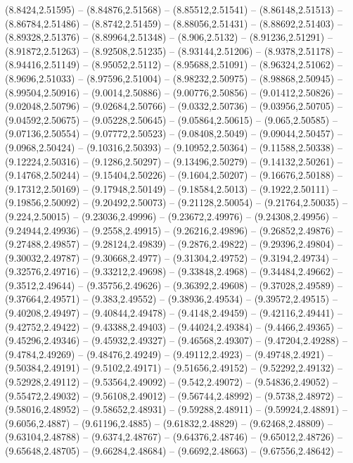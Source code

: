 {(8.8424,2.51595) -- (8.84876,2.51568) -- (8.85512,2.51541) -- (8.86148,2.51513) -- (8.86784,2.51486) -- (8.8742,2.51459) -- (8.88056,2.51431) -- (8.88692,2.51403) -- (8.89328,2.51376) -- (8.89964,2.51348) -- (8.906,2.5132) -- (8.91236,2.51291) --
(8.91872,2.51263) -- (8.92508,2.51235) -- (8.93144,2.51206) -- (8.9378,2.51178) -- (8.94416,2.51149) -- (8.95052,2.5112) -- (8.95688,2.51091) -- (8.96324,2.51062) -- (8.9696,2.51033) -- (8.97596,2.51004) -- (8.98232,2.50975) -- (8.98868,2.50945) --
(8.99504,2.50916) -- (9.0014,2.50886) -- (9.00776,2.50856) -- (9.01412,2.50826) -- (9.02048,2.50796) -- (9.02684,2.50766) -- (9.0332,2.50736) -- (9.03956,2.50705) -- (9.04592,2.50675) -- (9.05228,2.50645) -- (9.05864,2.50615) -- (9.065,2.50585) --
(9.07136,2.50554) -- (9.07772,2.50523) -- (9.08408,2.5049) -- (9.09044,2.50457) -- (9.0968,2.50424) -- (9.10316,2.50393) -- (9.10952,2.50364) -- (9.11588,2.50338) -- (9.12224,2.50316) -- (9.1286,2.50297) -- (9.13496,2.50279) -- (9.14132,2.50261) --
(9.14768,2.50244) -- (9.15404,2.50226) -- (9.1604,2.50207) -- (9.16676,2.50188) -- (9.17312,2.50169) -- (9.17948,2.50149) -- (9.18584,2.5013) -- (9.1922,2.50111) -- (9.19856,2.50092) -- (9.20492,2.50073) -- (9.21128,2.50054) -- (9.21764,2.50035) --
(9.224,2.50015) -- (9.23036,2.49996) -- (9.23672,2.49976) -- (9.24308,2.49956) -- (9.24944,2.49936) -- (9.2558,2.49915) -- (9.26216,2.49896) -- (9.26852,2.49876) -- (9.27488,2.49857) -- (9.28124,2.49839) -- (9.2876,2.49822) -- (9.29396,2.49804) --
(9.30032,2.49787) -- (9.30668,2.4977) -- (9.31304,2.49752) -- (9.3194,2.49734) -- (9.32576,2.49716) -- (9.33212,2.49698) -- (9.33848,2.4968) -- (9.34484,2.49662) -- (9.3512,2.49644) -- (9.35756,2.49626) -- (9.36392,2.49608) -- (9.37028,2.49589) --
(9.37664,2.49571) -- (9.383,2.49552) -- (9.38936,2.49534) -- (9.39572,2.49515) -- (9.40208,2.49497) -- (9.40844,2.49478) -- (9.4148,2.49459) -- (9.42116,2.49441) -- (9.42752,2.49422) -- (9.43388,2.49403) -- (9.44024,2.49384) -- (9.4466,2.49365) --
(9.45296,2.49346) -- (9.45932,2.49327) -- (9.46568,2.49307) -- (9.47204,2.49288) -- (9.4784,2.49269) -- (9.48476,2.49249) -- (9.49112,2.4923) -- (9.49748,2.4921) -- (9.50384,2.49191) -- (9.5102,2.49171) -- (9.51656,2.49152) -- (9.52292,2.49132) --
(9.52928,2.49112) -- (9.53564,2.49092) -- (9.542,2.49072) -- (9.54836,2.49052) -- (9.55472,2.49032) -- (9.56108,2.49012) -- (9.56744,2.48992) -- (9.5738,2.48972) -- (9.58016,2.48952) -- (9.58652,2.48931) -- (9.59288,2.48911) -- (9.59924,2.48891) --
(9.6056,2.4887) -- (9.61196,2.4885) -- (9.61832,2.48829) -- (9.62468,2.48809) -- (9.63104,2.48788) -- (9.6374,2.48767) -- (9.64376,2.48746) -- (9.65012,2.48726) -- (9.65648,2.48705) -- (9.66284,2.48684) -- (9.6692,2.48663) -- (9.67556,2.48642) --
}
